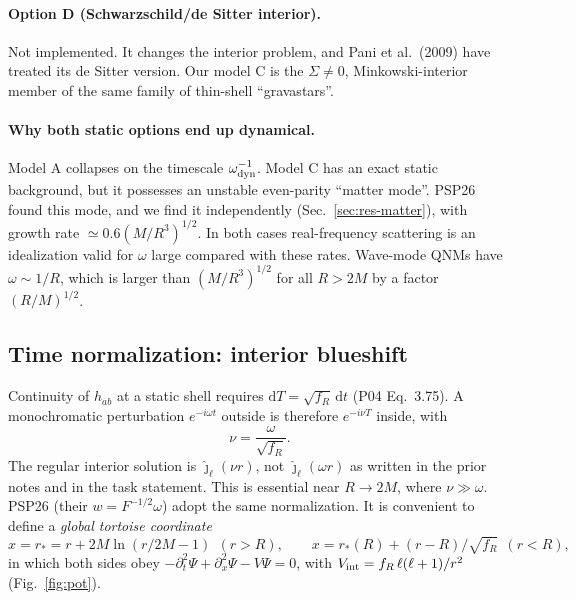 \documentclass[11pt,a4paper]{article}
\numberwithin{equation}{section}
\newcommand{\sq}{\sqrt{f_R}}
\newcommand{\dd}{\mathrm{d}}
\newcommand{\jh}{\hat\jmath_\ell}
\begin{document}
\paragraph{Option D (Schwarzschild/de Sitter interior).} Not implemented. It changes the interior problem,
and Pani et al.\ (2009) have treated its de Sitter version. Our model C is the $\Sigma\neq0$,
Minkowski-interior member of the same family of thin-shell ``gravastars''.

\paragraph{Why both static options end up dynamical.}
Model A collapses on the timescale $\omega_{\rm dyn}^{-1}$. Model C has an exact static background, but it
possesses an unstable even-parity ``matter mode''. PSP26 found this mode, and we find it independently
(Sec.~\ref{sec:res-matter}), with growth rate $\simeq0.6(M/R^3)^{1/2}$. In both cases real-frequency
scattering is an idealization valid for $\omega$ large compared with these rates. Wave-mode QNMs have
$\omega\sim1/R$, which is larger than $(M/R^3)^{1/2}$ for all $R>2M$ by a factor $(R/M)^{1/2}$.

\subsection{Time normalization: interior blueshift}\label{sec:blueshift}
Continuity of $h_{ab}$ at a static shell requires $\dd T=\sq\,\dd t$ (P04 Eq.~3.75). A monochromatic
perturbation $e^{-i\omega t}$ outside is therefore $e^{-i\nu T}$ inside, with
\begin{equation}
\nu=\frac{\omega}{\sq} .
\label{eq:nu}
\end{equation}
The regular interior solution is $\jh(\nu r)$, not $\jh(\omega r)$ as written in the prior notes and in the task
statement. This is essential near $R\to2M$, where $\nu\gg\omega$. PSP26 (their $w=F^{-1/2}\omega$) adopt the
same normalization. It is convenient to define a \emph{global tortoise coordinate}
\begin{equation}
x=r_*=r+2M\ln(r/2M-1)\ \ (r>R),\qquad x=r_*(R)+(r-R)/\sq\ \ (r<R),
\label{eq:x}
\end{equation}
in which both sides obey $-\partial_t^2\Psi+\partial_x^2\Psi-V\Psi=0$, with $V_{\rm int}=f_R\,\ell(\ell+1)/r^2$
(Fig.~\ref{fig:pot}).

\begin{table}[t]\centering
\caption{Background quantities (from \texttt{results/validation.json}). The column
$(M/R^3)^{1/2}$ sets the scale of the model-C instability rate ($\simeq0.6$ times this) and of the
matter modes. $\omega_{\rm dyn}$ is the domain-wall collapse rate in exterior time.}\label{tab:bg}

\end{table}
\end{document}
